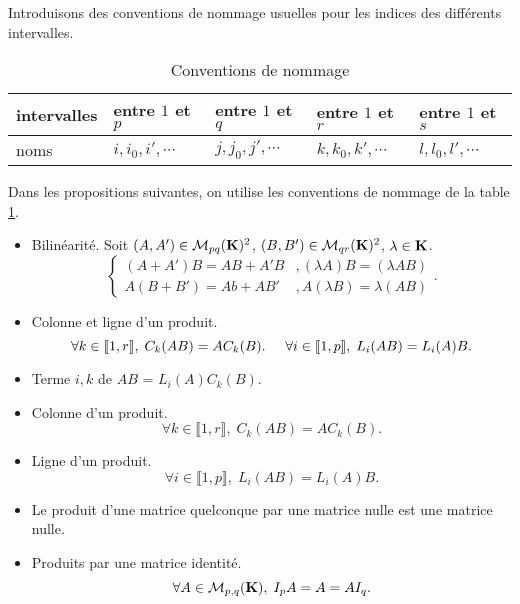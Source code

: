Introduisons des conventions de nommage usuelles pour les indices des différents intervalles.
\begin{table}[!ht]
\begin{center}
\renewcommand{\arraystretch}{1.5}
\begin{tabular}{|l|l|l|l|l|} \hline
intervalles & entre $1$ et $p$ & entre $1$ et $q$ & entre $1$ et $r$ & entre $1$ et $s$ \\ \hline
noms & $i,i_0,i',\cdots$ & $j,j_0,j',\cdots$ & $k,k_0,k',\cdots$ & $l,l_0,l',\cdots$ \\ \hline
\end{tabular}
\end{center}
\caption{Conventions de nommage} \label{tab: convnom}
\end{table} 

\begin{prop}
Dans les propositions suivantes, on utilise les conventions de nommage de la table \ref{tab: convnom}. 
 \begin{itemize}
  \item Bilinéarité. Soit $(A,A') \in \mathcal{M}_{pq}(\mathbf{K})^2$, $(B,B') \in \mathcal{M}_{qr}(\mathbf{K})^2$, $\lambda  \in\mathbf{K}$. 
\[ 
 \left\lbrace 
 \begin{aligned}
  (A + A') B = AB + A'B &, (\lambda A)B= (\lambda AB)\\
  A(B+B') = Ab + AB' &, A(\lambda B) = \lambda (AB)
 \end{aligned}
\right. .
\]

\item Colonne et ligne d'un produit.
\[
\forall k \in \llbracket 1,r\rrbracket,\; C_{k}(AB) = AC_{k}(B).\hspace{0.5cm}
\forall i \in \llbracket 1,p \rrbracket, \;  L_{i}(AB) = L_{i}(A)B. 
\]

\item Terme $i,k$ de $AB$ = $L_i(A)C_k(B)$.
\item Colonne d'un produit.
\[
\forall k \in \llbracket 1,r\rrbracket,\; C_k(AB) = A C_k(B). 
\]

\item Ligne d'un produit.
\[
\forall i \in \llbracket 1,p \rrbracket, \;L_i(AB) = L_i(A) B. 
\]

\item Le produit d'une matrice quelconque par une matrice nulle est une matrice nulle.

\item Produits par une matrice identité.
\[
 \forall A \in \mathcal{M}_{p,q}(\mathbf{K}),\; I_p A = A = A I_q.
\]


\end{itemize}
\end{prop}
